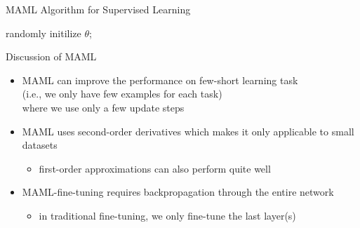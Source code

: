 \begin{frame}[c]{MAML Algorithm for Supervised Learning}

\begin{algorithm}[H]
	\BlankLine
	randomly initilize $\theta$;\\
	
\end{algorithm}

\end{frame}
\begin{frame}[c]{Discussion of MAML}

\begin{itemize}
	\item MAML can improve the performance on \alert{few-short learning task}\\
	(i.e., we only have few examples for each task)\\
	where we use only a \alert{few update steps}
	\pause
	\smallskip
	\item MAML uses \alert{second-order derivatives} which makes it only applicable to small datasets\\
	\begin{itemize}
		\item first-order approximations can also perform quite well
	\end{itemize}
	\pause
	\smallskip
	\item MAML-fine-tuning requires \alert{backpropagation through the entire network}
	\begin{itemize}
		\item in traditional fine-tuning, we only fine-tune the last layer(s)
	\end{itemize}
	
\end{itemize}

\end{frame}
